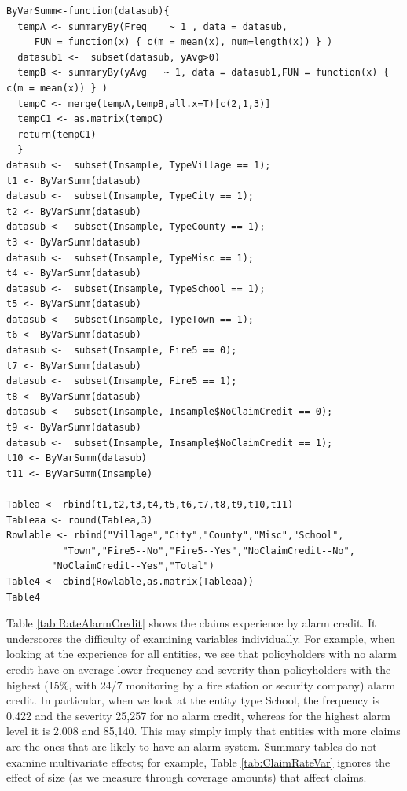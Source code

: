 \documentclass[]{book}
\theoremstyle{definition}
\theoremstyle{definition}
\theoremstyle{definition}
\theoremstyle{remark}
\begin{document}
\hypertarget{display.ClaimRateVar.2}{}
\begin{verbatim}
ByVarSumm<-function(datasub){
  tempA <- summaryBy(Freq    ~ 1 , data = datasub,   
     FUN = function(x) { c(m = mean(x), num=length(x)) } )
  datasub1 <-  subset(datasub, yAvg>0)
  tempB <- summaryBy(yAvg   ~ 1, data = datasub1,FUN = function(x) { c(m = mean(x)) } )
  tempC <- merge(tempA,tempB,all.x=T)[c(2,1,3)]
  tempC1 <- as.matrix(tempC)
  return(tempC1)
  }
datasub <-  subset(Insample, TypeVillage == 1);   
t1 <- ByVarSumm(datasub)
datasub <-  subset(Insample, TypeCity == 1);      
t2 <- ByVarSumm(datasub)
datasub <-  subset(Insample, TypeCounty == 1);   
t3 <- ByVarSumm(datasub)
datasub <-  subset(Insample, TypeMisc == 1);      
t4 <- ByVarSumm(datasub)
datasub <-  subset(Insample, TypeSchool == 1);    
t5 <- ByVarSumm(datasub)
datasub <-  subset(Insample, TypeTown == 1);      
t6 <- ByVarSumm(datasub)
datasub <-  subset(Insample, Fire5 == 0);                      
t7 <- ByVarSumm(datasub)
datasub <-  subset(Insample, Fire5 == 1);                      
t8 <- ByVarSumm(datasub)
datasub <-  subset(Insample, Insample$NoClaimCredit == 0);
t9 <- ByVarSumm(datasub)
datasub <-  subset(Insample, Insample$NoClaimCredit == 1);
t10 <- ByVarSumm(datasub)
t11 <- ByVarSumm(Insample)

Tablea <- rbind(t1,t2,t3,t4,t5,t6,t7,t8,t9,t10,t11)
Tableaa <- round(Tablea,3)
Rowlable <- rbind("Village","City","County","Misc","School",
          "Town","Fire5--No","Fire5--Yes","NoClaimCredit--No",
        "NoClaimCredit--Yes","Total")
Table4 <- cbind(Rowlable,as.matrix(Tableaa))
Table4
\end{verbatim}

Table \ref{tab:RateAlarmCredit} shows the claims experience by alarm
credit. It underscores the difficulty of examining variables
individually. For example, when looking at the experience for all
entities, we see that policyholders with no alarm credit have on average
lower frequency and severity than policyholders with the highest (15\%,
with 24/7 monitoring by a fire station or security company) alarm
credit. In particular, when we look at the entity type School, the
frequency is 0.422 and the severity 25,257 for no alarm credit, whereas
for the highest alarm level it is 2.008 and 85,140. This may simply
imply that entities with more claims are the ones that are likely to
have an alarm system. Summary tables do not examine multivariate
effects; for example, Table \ref{tab:ClaimRateVar} ignores the effect of
size (as we measure through coverage amounts) that affect claims.
\end{document}
